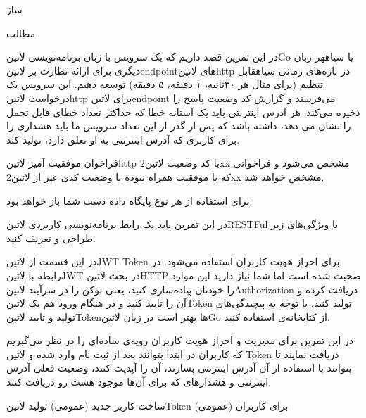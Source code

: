 \documentclass{../assignment}
\begin{document}
‌ساز

‌مطالب


در این تمرین قصد داریم که یک سرویس با زبان برنامه‌نویسی ‌لاتین{Go} یا ‌سیاه{هر زبان دیگری} برای ارائه نظارت بر ‌لاتین{endpoint}های ‌لاتین{http} در بازه‌های زمانی ‌سیاه{قابل تنظیم} (برای مثال هر ۳۰ثانیه، ۱ دقیقه، ۵ دقیقه) توسعه دهیم. این سرویس یک درخواست ‌لاتین{http} برای ‌لاتین{endpoint} می‌فرستد
و گزارش کد وضعیت پاسخ را ذخیره می‌کند. هر آدرس اینترنتی باید یک آستانه خطا که حداکثر تعداد خطای قابل تحمل را نشان می دهد، داشته باشد که پس از گذر از این تعداد سرویس ما باید هشداری را برای کاربری که آدرس اینترنتی به او تعلق دارد، تولید کند.

فراخوان موفقیت آمیز ‌لاتین{http} با کد وضعیت ‌لاتین{2xx} مشخص می‌شود و فراخوانی که با موفقیت همراه نبوده با وضعیت کدی غیر از ‌لاتین{2xx} مشخص خواهد شد.


برای استفاده از هر نوع پایگاه داده دست شما باز خواهد بود.


در این تمرین باید یک رابط برنامه‌نویسی کاربردی ‌لاتین{RESTFul} با ویژگی‌های زیر طراحی و تعریف کنید.


در این قسمت از ‌لاتین{JWT Token} برای احراز هویت کاربران استفاده می‌شود. در رابطه با ‌لاتین{JWT} در بحث ‌لاتین{HTTP} صحبت شده است اما شما نیاز دارید
این موارد را خودتان پیاده‌سازی کنید، یعنی توکن را در سرآیند ‌لاتین{Authorization} دریافت کرده و آن را تایید کنید و در هنگام ورود هم یک ‌لاتین{Token} تولید کنید.
با توجه به پیچیدگی‌های تولید و تایید ‌لاتین{Token}ها بهتر است در زبان ‌لاتین{Go} از کتابخانه‌ی  استفاده کنید.


در این تمرین برای مدیریت و احراز هویت کاربران رویه‌ی ساده‌ای را در نظر می‌گبریم که کاربران در ابتدا بتوانند بعد از ثبت نام وارد شده و ‌لاتین {Token} دریافت نمایند
تا بتوانند با استفاده از آن آدرس اینترنتی بسازند، آن را آپدیت کنند،‌ وضعیت فعلی آدرس اینترنتی و هشدار‌های که برای آن‌ها موجود هست رو دریافت کنند.


 ساخت کاربر جدید (عمومی)
 تولید ‌لاتین{Token} برای کاربران (عمومی)
\end{document}
